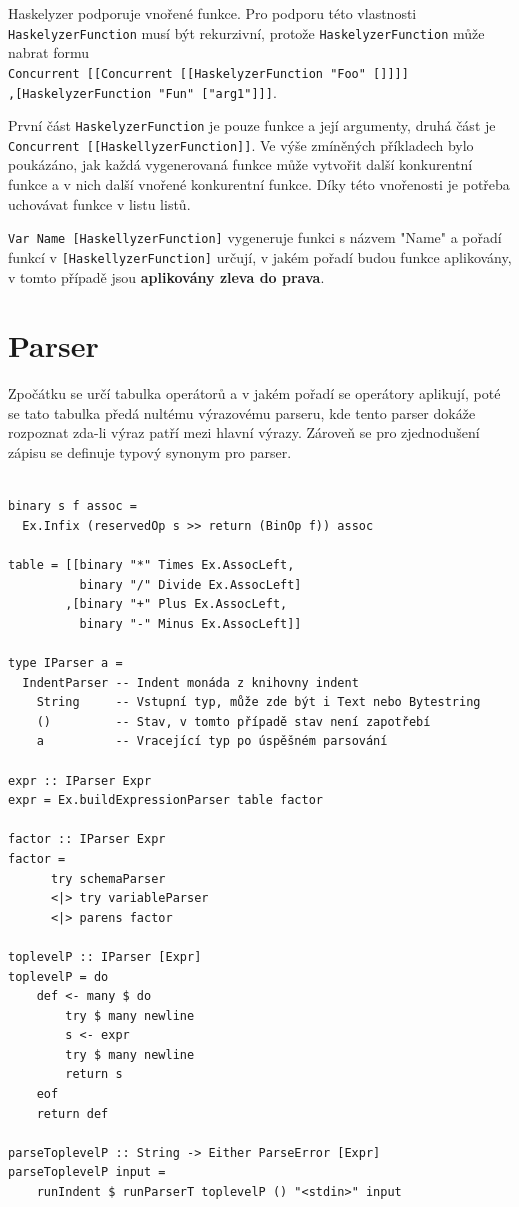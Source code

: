 \documentclass[male,czech]{kithesis}
\newcommand{\haskellInline}[1]{\colorbox{gray!10}{\texttt{#1}}}
\begin{document}
Haskelyzer podporuje vnořené funkce. 
Pro podporu této vlastnosti \haskellInline{HaskelyzerFunction} musí být rekurzivní, 
protože \haskellInline{HaskelyzerFunction} může nabrat formu 
\\
\haskellInline{Concurrent [[Concurrent [[HaskelyzerFunction "Foo" []]]]}
\\
\haskellInline{,[HaskelyzerFunction "Fun" ["arg1"]]]}.

První část \haskellInline{HaskelyzerFunction} je pouze funkce a 
její argumenty, 
druhá část je \\
\haskellInline{Concurrent [[HaskellyzerFunction]]}.
Ve výše zmíněných příkladech bylo poukázáno, 
jak každá vygenerovaná funkce může vytvořit 
další konkurentní funkce a v nich další vnořené konkurentní funkce. 
Díky této vnořenosti 
je potřeba uchovávat funkce v listu listů.

\haskellInline{Var Name [HaskellyzerFunction]} vygeneruje funkci s názvem "Name" a 
pořadí funkcí v \haskellInline{[HaskellyzerFunction]} určují, 
v jakém pořadí budou funkce aplikovány,
v tomto případě jsou \textbf{aplikovány zleva do prava}.

\section{Parser}

Zpočátku se určí tabulka operátorů a 
v jakém pořadí se operátory aplikují, 
poté se tato tabulka předá nultému výrazovému parseru, 
kde tento parser dokáže rozpoznat zda-li výraz patří mezi
hlavní výrazy. 
Zároveň se pro zjednodušení zápisu se definuje typový 
synonym pro parser.

\begin{verbatim}

binary s f assoc = 
  Ex.Infix (reservedOp s >> return (BinOp f)) assoc

table = [[binary "*" Times Ex.AssocLeft,
          binary "/" Divide Ex.AssocLeft]
        ,[binary "+" Plus Ex.AssocLeft,
          binary "-" Minus Ex.AssocLeft]]

type IParser a = 
  IndentParser -- Indent monáda z knihovny indent
    String     -- Vstupní typ, může zde být i Text nebo Bytestring
    ()         -- Stav, v tomto případě stav není zapotřebí
    a          -- Vracející typ po úspěšném parsování

expr :: IParser Expr
expr = Ex.buildExpressionParser table factor

factor :: IParser Expr
factor = 
      try schemaParser 
      <|> try variableParser
      <|> parens factor 

toplevelP :: IParser [Expr]
toplevelP = do 
    def <- many $ do 
        try $ many newline
        s <- expr 
        try $ many newline
        return s
    eof
    return def

parseToplevelP :: String -> Either ParseError [Expr]
parseToplevelP input = 
    runIndent $ runParserT toplevelP () "<stdin>" input

\end{verbatim}
\end{document}
